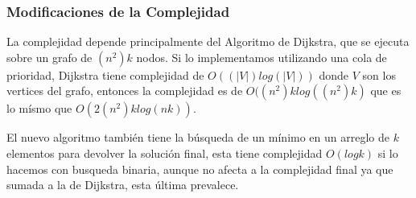 \subsubsection{Modificaciones de la Complejidad}

La complejidad depende principalmente del Algoritmo de Dijkstra, que se ejecuta sobre un grafo de $(n^2)k$ nodos. Si lo implementamos utilizando una cola de prioridad, Dijkstra tiene complejidad de $O((|V|)log(|V|))$ donde $V$ son los vertices del grafo, entonces la complejidad es de $O((n^2)k log((n^2)k)$ que es lo m\'ismo que $O(2(n^2)k log(nk))$.

El nuevo algoritmo tambi\'en tiene la b\'usqueda de un m\'inimo en un arreglo de $k$ elementos para devolver la soluci\'on final, esta tiene complejidad $O(log k)$ si lo hacemos con busqueda binaria, aunque no afecta a la complejidad final ya que sumada a la de Dijkstra, esta \'ultima prevalece.




